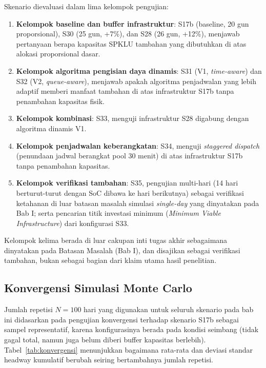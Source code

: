 Skenario dievaluasi dalam lima kelompok pengujian:
\begin{enumerate}
	\item \textbf{Kelompok baseline dan buffer infrastruktur}: S17b (baseline,
	20 gun proporsional), S30 (25 gun, +7\%), dan S28 (26 gun, +12\%),
	menjawab pertanyaan berapa kapasitas SPKLU tambahan yang dibutuhkan di
	atas alokasi proporsional dasar.
	\item \textbf{Kelompok algoritma pengisian daya dinamis}: S31 (V1,
	\textit{time-aware}) dan S32 (V2, \textit{queue-aware}), menjawab
	apakah algoritma penjadwalan yang lebih adaptif memberi manfaat
	tambahan di atas infrastruktur S17b tanpa penambahan kapasitas fisik.
	\item \textbf{Kelompok kombinasi}: S33, menguji infrastruktur S28
	digabung dengan algoritma dinamis V1.
	\item \textbf{Kelompok penjadwalan keberangkatan}: S34, menguji
	\textit{staggered dispatch} (penundaan jadwal berangkat pool 30 menit)
	di atas infrastruktur S17b tanpa penambahan kapasitas.
	\item \textbf{Kelompok verifikasi tambahan}: S35, pengujian multi-hari
	(14 hari berturut-turut dengan SoC dibawa ke hari berikutnya) sebagai
	verifikasi ketahanan di luar batasan masalah simulasi \textit{
		single-day} yang dinyatakan pada Bab I; serta pencarian titik investasi
	minimum (\textit{Minimum Viable Infrastructure}) dari konfigurasi S33.
\end{enumerate}

Kelompok kelima berada di luar cakupan inti tugas akhir sebagaimana
dinyatakan pada Batasan Masalah (Bab I), dan disajikan sebagai verifikasi
tambahan, bukan sebagai bagian dari klaim utama hasil penelitian.

\subsection{Konvergensi Simulasi Monte Carlo}

Jumlah repetisi $N=100$ hari yang digunakan untuk seluruh skenario pada
bab ini didasarkan pada pengujian konvergensi terhadap skenario S17b
sebagai sampel representatif, karena konfigurasinya berada pada kondisi
seimbang (tidak gagal total, namun juga belum diberi buffer kapasitas
berlebih). Tabel~\ref{tab:konvergensi} menunjukkan bagaimana rata-rata
dan deviasi standar headway kumulatif berubah seiring bertambahnya
jumlah repetisi.

